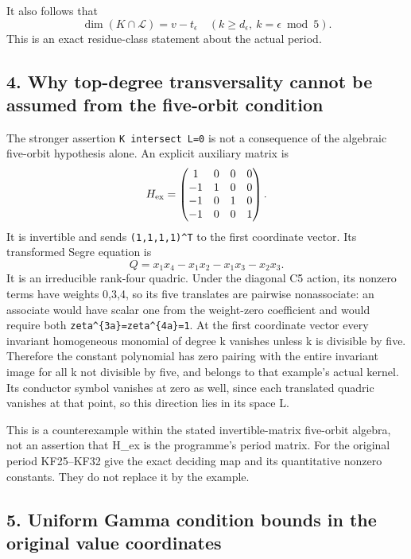 It also follows that \[
\dim(K\cap\mathcal L)=v-t_\epsilon
\quad(k\ge d_\epsilon,\ k=\epsilon\bmod5).
\tag{KF32}
\] This is an exact residue-class statement about the actual period.

\subsection{4. Why top-degree transversality cannot be assumed from the five-orbit condition}\label{why-top-degree-transversality-cannot-be-assumed-from-the-five-orbit-condition}

The stronger assertion \texttt{K\ intersect\ L=0} is not a consequence of the algebraic five-orbit hypothesis alone. An explicit auxiliary matrix is \[
H_{\rm ex}=\begin{pmatrix}
1&0&0&0\\-1&1&0&0\\-1&0&1&0\\-1&0&0&1
\end{pmatrix}.
\] It is invertible and sends \texttt{(1,1,1,1)\^{}T} to the first coordinate vector. Its transformed Segre equation is \[
Q=x_1x_4-x_1x_2-x_1x_3-x_2x_3.
\] It is an irreducible rank-four quadric. Under the diagonal C5 action, its nonzero terms have weights 0,3,4, so its five translates are pairwise nonassociate: an associate would have scalar one from the weight-zero coefficient and would require both \nolinkurl{zeta^{3a}=zeta^{4a}=1}. At the first coordinate vector every invariant homogeneous monomial of degree k vanishes unless k is divisible by five. Therefore the constant polynomial has zero pairing with the entire invariant image for all k not divisible by five, and belongs to that example's actual kernel. Its conductor symbol vanishes at zero as well, since each translated quadric vanishes at that point, so this direction lies in its space L.

This is a counterexample within the stated invertible-matrix five-orbit algebra, not an assertion that H\_ex is the programme's period matrix. For the original period KF25--KF32 give the exact deciding map and its quantitative nonzero constants. They do not replace it by the example.

\subsection{5. Uniform Gamma condition bounds in the original value coordinates}\label{uniform-gamma-condition-bounds-in-the-original-value-coordinates}

